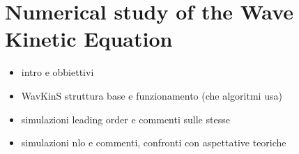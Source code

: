 

\newpage
\vphantom{}
\section{Numerical study of the Wave Kinetic Equation}

\begin{itemize}
    \item intro e obbiettivi
    \item WavKinS struttura base e funzionamento (che algoritmi usa)
    \item simulazioni leading order e commenti sulle stesse
    \item simulazioni nlo e commenti, confronti con aspettative teoriche
\end{itemize}

